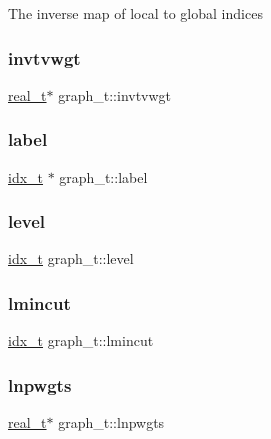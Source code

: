 The inverse map of local to global indices \mbox{\label{a00734_a25c1b2aeb241430033fb752ba11b5cbb}} 
\subsubsection{\texorpdfstring{invtvwgt}{invtvwgt}}
{\footnotesize\ttfamily \hyperlink{a00876_a1924a4f6907cc3833213aba1f07fcbe9}{real\+\_\+t}$\ast$ graph\+\_\+t\+::invtvwgt}

\mbox{\label{a00734_ab2ae2df953d94b5ca663e8e6cf8a2aa4}} 
\subsubsection{\texorpdfstring{label}{label}}
{\footnotesize\ttfamily \hyperlink{a00876_aaa5262be3e700770163401acb0150f52}{idx\+\_\+t} $\ast$ graph\+\_\+t\+::label}

\mbox{\label{a00734_a8ee3c5b86b691e2c96f78bffec6d46f2}} 
\subsubsection{\texorpdfstring{level}{level}}
{\footnotesize\ttfamily \hyperlink{a00876_aaa5262be3e700770163401acb0150f52}{idx\+\_\+t} graph\+\_\+t\+::level}

\mbox{\label{a00734_a92aa28928a30f09c684bea12ae2a5a9e}} 
\subsubsection{\texorpdfstring{lmincut}{lmincut}}
{\footnotesize\ttfamily \hyperlink{a00876_aaa5262be3e700770163401acb0150f52}{idx\+\_\+t} graph\+\_\+t\+::lmincut}

\mbox{\label{a00734_aca56fb74a4334fc2fd480383bec3e387}} 
\subsubsection{\texorpdfstring{lnpwgts}{lnpwgts}}
{\footnotesize\ttfamily \hyperlink{a00876_a1924a4f6907cc3833213aba1f07fcbe9}{real\+\_\+t}$\ast$ graph\+\_\+t\+::lnpwgts}

